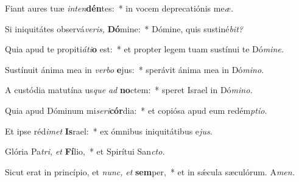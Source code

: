 \item Fiant aures tuæ \textit{inten}\textbf{dén}tes:~* in vocem deprecatiónis me\textit{æ.}
\item Si iniquitátes observá\textit{veris,} \textbf{Dó}mine:~* Dómine, quis sustiné\textit{bit?}
\item Quia apud te propiti\tinyhspace\textit{áti}\textbf{o} est:~* et propter legem tuam sustínui te Dó\textit{mine.}
\item Sustínuit ánima mea in \textit{verbo} \textbf{e}jus:~* sperávit ánima mea in Dó\textit{mino.}
\item A custódia matutína us\tinyhspace\textit{que} \textit{ad} \textbf{no}ctem:~* speret Israel in Dó\textit{mino.}
\item Quia apud Dóminum mi\textit{seri}\textbf{cór}dia:~* et copiósa apud eum red\-ém\textit{ptio.}
\item Et ipse réd\tinyhspace\textit{imet} \textbf{Is}rael:~* ex ómnibus iniquitátibus e\tinyhspace\textit{jus.}
\item Glória Pa\tinyhspace\textit{tri,} \textit{et} \textbf{Fí}lio,~* et Spirítui San\tinyhspace\textit{cto.}
\item Sicut erat in princípio, et \textit{nunc,} \textit{et} \textbf{sem}per,~* et in sǽcula sæculórum. A\textit{men.}